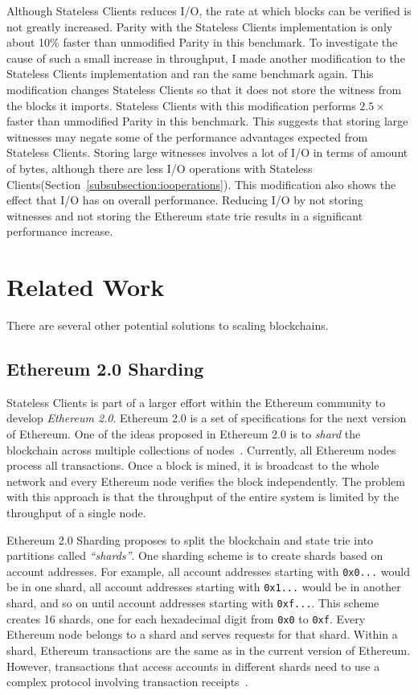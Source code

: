 \documentclass[12pt]{article}
\newcounter{protocol}
\newcommand{\System}{Stateless Clients\xspace}
\begin{document}
Although \System reduces I/O, the rate at which blocks can be verified is not greatly increased. Parity with the \System implementation is only about 10\% faster than unmodified Parity in this benchmark. To investigate the cause of such a small increase in throughput, I made another modification to the \System implementation and ran the same benchmark again. This modification changes \System so that it does not store the witness from the blocks it imports. \System with this modification performs $2.5\times$ faster than unmodified Parity in this benchmark. This suggests that storing large witnesses may negate some of the performance advantages expected from \System. Storing large witnesses involves a lot of I/O in terms of amount of bytes, although there are less I/O operations with \System (Section~\ref{subsubsection:iooperations}). This modification also shows the effect that I/O has on overall performance. Reducing I/O by not storing witnesses and not storing the Ethereum state trie results in a significant performance increase.


\section{Related Work}

There are several other potential solutions to scaling blockchains.

\subsection{Ethereum 2.0 Sharding} \label{subsection:ethereumsharding}


\System is part of a larger effort within the Ethereum community to develop \emph{Ethereum 2.0}. Ethereum 2.0 is a set of specifications for the next version of Ethereum. One of the ideas proposed in Ethereum 2.0 is to \emph{shard} the blockchain across multiple collections of nodes~\cite{ethereum-sharding}. Currently, all Ethereum nodes process all transactions. Once a block is mined, it is broadcast to the whole network and every Ethereum node verifies the block independently. The problem with this approach is that the throughput of the entire system is limited by the throughput of a single node.

Ethereum 2.0 Sharding proposes to split the blockchain and state trie into partitions called \emph{``shards''}. One sharding scheme is to create shards based on account addresses. For example, all account addresses starting with \texttt{0x0...} would be in one shard, all account addresses starting with \texttt{0x1...} would be in another shard, and so on until account addresses starting with \texttt{0xf...}. This scheme creates 16 shards, one for each hexadecimal digit from \texttt{0x0} to \texttt{0xf}. Every Ethereum node belongs to a shard and serves requests for that shard. Within a shard, Ethereum transactions are the same as in the current version of Ethereum. However, transactions that access accounts in different shards need to use a complex protocol involving transaction receipts~\cite{ethereum-cross-shard}.
\end{document}
